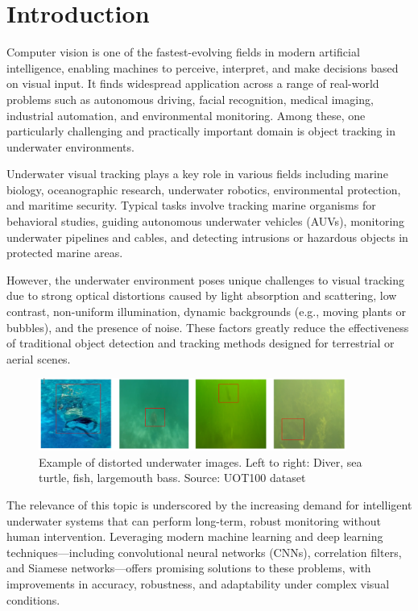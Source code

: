 \chapter*{Introduction}
\label{ch:intro}

Computer vision is one of the fastest-evolving fields in modern artificial intelligence, enabling machines to perceive, interpret, and make decisions based on visual input. It finds widespread application across a range of real-world problems such as autonomous driving, facial recognition, medical imaging, industrial automation, and environmental monitoring. Among these, one particularly challenging and practically important domain is object tracking in underwater environments.

Underwater visual tracking plays a key role in various fields including marine biology, oceanographic research, underwater robotics, environmental protection, and maritime security. Typical tasks involve tracking marine organisms for behavioral studies, guiding autonomous underwater vehicles (AUVs), monitoring underwater pipelines and cables, and detecting intrusions or hazardous objects in protected marine areas.

However, the underwater environment poses unique challenges to visual tracking due to strong optical distortions caused by light absorption and scattering, low contrast, non-uniform illumination, dynamic backgrounds (e.g., moving plants or bubbles), and the presence of noise. These factors greatly reduce the effectiveness of traditional object detection and tracking methods designed for terrestrial or aerial scenes.

\begin{figure}[ht]
    \centering
    \includegraphics[width=0.9\textwidth]{images/example-underwater-tracking.png}
    \caption{Example of distorted underwater images. Left to right: Diver, sea turtle, fish, largemouth bass. Source: UOT100 dataset \cite{kezebou2019underwater}}
\end{figure}

The relevance of this topic is underscored by the increasing demand for intelligent underwater systems that can perform long-term, robust monitoring without human intervention. Leveraging modern machine learning and deep learning techniques—including convolutional neural networks (CNNs), correlation filters, and Siamese networks—offers promising solutions to these problems, with improvements in accuracy, robustness, and adaptability under complex visual conditions.

